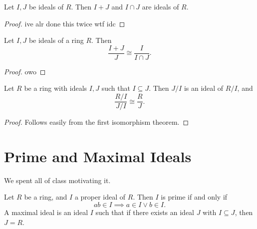 \begin{proposition}\label{prp:2.5}
	Let $I,J$ be ideals of $R$. Then $I+J$ and $I \cap J$ are ideals of $R$.
\end{proposition}
\begin{proof}
	ive alr done this twice wtf idc
\end{proof}
\begin{theorem}\label{thm:2.2}
	Let $I,J$ be ideals of a ring $R$. Then
	\[
		\frac{I+J}{J} \cong \frac{I}{I \cap J} 
	.\]
\end{theorem}
\begin{proof}
	owo
\end{proof}
\begin{theorem}\label{thm:2.3}
	Let $R$ be a ring with ideals $I,J$ such that $I\subseteq J$. Then $J/I$ is an ideal of $R/I$, and
	\[
		\frac{R/I}{J/I} \cong \frac{R}{J} 
	.\]
\end{theorem}
\begin{proof}
	Follows easily from the first isomorphism theorem.
\end{proof}
\section{Prime and Maximal Ideals}
We spent all of class motivating it.
\begin{definition}\label{dfn:2.5}
	Let $R$ be a ring, and $I$ a proper ideal of $R$. Then $I$ is prime if and only if
	\[
		ab\in I \implies a\in I \lor b\in I
	.\]
	A maximal ideal is an ideal $I$ such that if there exists an ideal $J$ with $I\subseteq J$, then $J=R$.
\end{definition}


